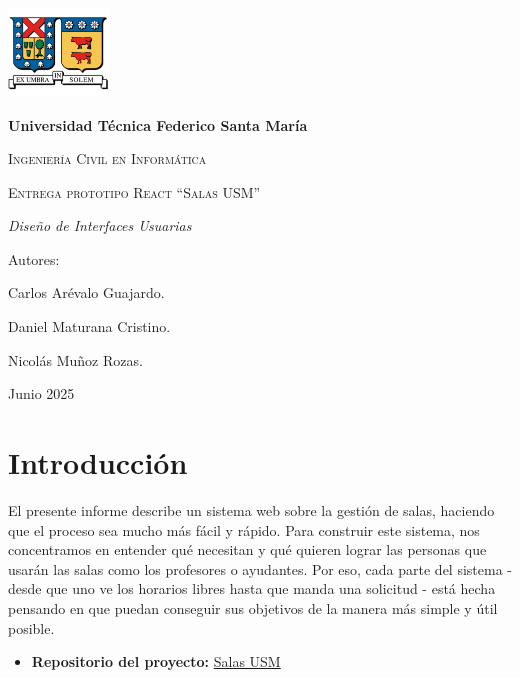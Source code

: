 \documentclass{article}
\begin{document}
    \begin{titlepage}
        \centering
        {\includegraphics[width=0.2\textwidth]{IMG/Logo_UTFSM.png}\par}
        \vspace{1cm}
        {\bfseries\LARGE Universidad Técnica Federico Santa María \par}
        \vspace{1cm}
        {\scshape\Large Ingeniería Civil en Informática \par}
        \vspace{3cm}
        {\scshape\Huge Entrega prototipo React ``Salas USM'' \par}
        \vspace{3cm}
        {\itshape\Large Diseño de Interfaces Usuarias \par}
        \vfill
        {\Large Autores: \par}
        {\Large Carlos Arévalo Guajardo.  \par}
        {\Large Daniel Maturana Cristino.  \par}
        {\Large Nicolás Muñoz Rozas.  \par}
        \vfill
        {\Large Junio 2025 \par}
    \end{titlepage}

    \newpage

    \section{Introducción}
    
    El presente informe describe un sistema web sobre la gestión de salas, haciendo que el proceso sea mucho más fácil y rápido. Para construir este sistema, nos concentramos en entender qué necesitan y qué quieren lograr las personas que usarán las salas como los profesores o ayudantes. Por eso, cada parte del sistema - desde que uno ve los horarios libres hasta que manda una solicitud - está hecha pensando en que puedan conseguir sus objetivos de la manera más simple y útil posible.
    
    \begin{itemize}
        \item \textbf{Repositorio del proyecto:} \href{https://github.com/Xharless/DIU}{Salas USM} 
    \end{itemize}
    
\end{document}
